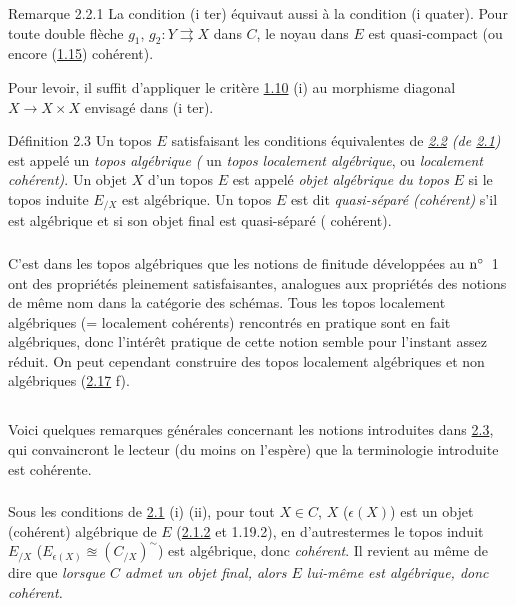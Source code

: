 \begin{enonce*}[remark]{Remarque 2.2.1}
La condition (i ter) équivaut aussi à la condition (i quater). Pour
toute double flèche $g_1$, $g_2 : Y \rightrightarrows X$  dans $C$, le
noyau dans $E$ est quasi-compact (ou encore (\hyperref[VI.cor1.15]{1.15}) cohérent).
\end{enonce*}

Pour le\pageoriginale voir, il suffit d'appliquer le critère \hyperref[VI.prop1.10]{1.10} (i)
au morphisme diagonal $X \to X \times X$ envisagé dans (i ter).

\begin{enonce*}{Définition 2.3}
Un topos $E$ satisfaisant les conditions équivalentes de \emph{\hyperref[VI.prop2.2]{2.2} (\resp de
\hyperref[VI.prop2.1]{2.1})} est appelé un \emph{topos algébrique (\resp} un \emph{topos localement
algébrique}, ou \emph{localement cohérent)}. Un objet $X$ d'un topos $E$ est
appelé \emph{objet algébrique du topos} $E$ si le topos induite $E_{/X}$ est
algébrique. Un topos $E$ est dit \emph{quasi-séparé (\resp cohérent)} s'il
est algébrique et si son objet final est quasi-séparé (\resp
cohérent).
\end{enonce*}

\setcounter{subsection}{3}
\subsubsection{}
C'est dans les topos algébriques que les notions de finitude
développées au ${\rm n^{\circ}}$~1 ont des propriétés pleinement
satisfaisantes, analogues aux propriétés des notions de même nom dans
la catégorie des schémas. Tous les topos localement algébriques (=
localement cohérents) rencontrés en pratique sont en fait algébriques,
donc l'intérêt pratique de cette notion semble pour l'instant assez
réduit. On peut cependant construire des topos localement algébriques
et non algébriques (\hyperref[VI.exer2.17]{2.17} f).

\subsection{}
Voici quelques remarques générales concernant les notions introduites
dans \hyperref[VI.def2.3]{2.3}, qui convaincront le lecteur (du moins on
l'espère) que la terminologie introduite est cohérente.

\subsubsection{}
Sous les conditions de \hyperref[VI.prop2.1]{2.1} (i) \resp (ii), pour tout $X \in C$, $X$
(\resp $\epsilon(X)$) est un objet (cohérent) algébrique de $E$
(\hyperref[VI.cor2.1.2]{2.1.2} et 1.19.2),
en d'autres\pageoriginale termes le topos induit
$E_{/X}$ (\resp $E_{\epsilon(X)} \approxeq (C_{/X})^{\sim}$) est
algébrique, donc
\emph{cohérent}. Il revient au même de dire que \emph{lorsque
$C$ admet un objet
final, alors $E$ lui-même est algébrique, donc cohérent.}

